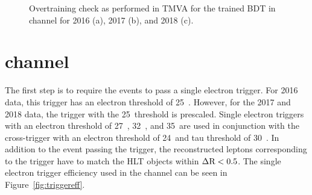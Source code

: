 \begin{figure}[htbp]
  \centering
  \caption{Overtraining check as performed in TMVA for the trained BDT in \mue channel for 2016 (a), 2017 (b), and 2018 (c).}
  \label{fig:mutaue_bdttrain}
\end{figure}

\section{\texorpdfstring{\Hehad}{Hetauh} channel}
The first step is to require the events to pass a single electron trigger. For 2016 data, this trigger has an electron \pt threshold of 25~\GeV. However, for the 2017 and 2018 data, the trigger with the 25~\GeV threshold is prescaled. Single electron triggers with an electron \pt threshold of 27~\GeV, 32~\GeV, and 35~\GeV are used in conjunction with the cross-trigger with an electron \pt threshold of 24~\GeV and tau \pt threshold of 30~\GeV. In addition to the event passing the trigger, the reconstructed leptons corresponding to the trigger have to match the HLT objects within $\Delta \text{R} < 0.5$. The single electron trigger efficiency used in the \ehad channel can be seen in Figure~\ref{fig:triggereff}.

